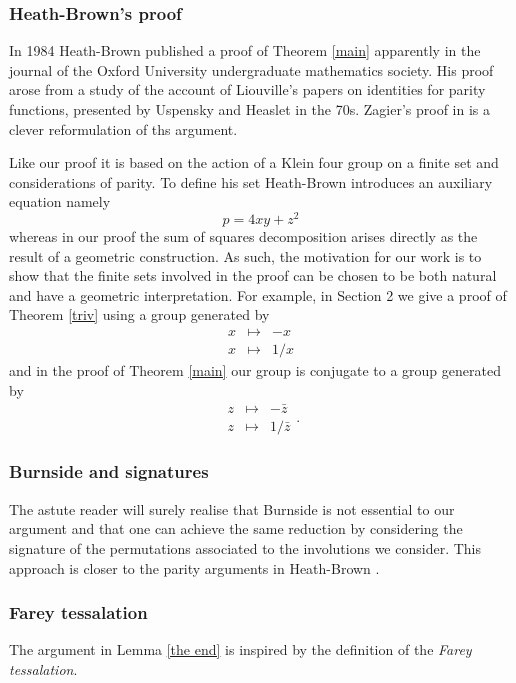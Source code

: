 \subsubsection{Heath-Brown's proof}

In 1984 Heath-Brown published a proof of Theorem \ref{main}
apparently  in the journal of the Oxford University undergraduate mathematics society. 
His proof arose from a study of the account of Liouville’s papers on identities for parity functions, presented  by Uspensky and Heaslet in the 70s. Zagier's proof in \cite{zagier} is a clever reformulation of ths argument.

Like our  proof it is based on the action of a Klein four group 
on a finite set and considerations of parity.
To define his set Heath-Brown introduces an auxiliary equation namely
$$p = 4xy + z^2$$
whereas in our proof the sum of squares decomposition 
arises directly as the  result of a geometric construction.
As such, the motivation for our work is to show that 
the finite sets involved in the proof 
can be chosen to be both natural and have a geometric interpretation.
For example, in Section 2 we give a proof of Theorem \ref{triv}
using a group generated by 
$$ \begin{array}{lll}
x &\mapsto& -x \\
x &\mapsto& 1/x
\end{array}
$$
and in the proof of Theorem \ref{main}
our group is conjugate to a group generated by 
$$ \begin{array}{lll}
z &\mapsto& -\bar{z} \\
z &\mapsto& 1/\bar{z}
\end{array}.
$$



\subsubsection{Burnside and signatures}
 The astute reader will surely realise that Burnside is not essential to our argument
 and that one can achieve the same reduction by considering the signature
 of the permutations associated to the  involutions we consider. 
 This approach is closer to the parity arguments in Heath-Brown \cite{heath}.
 
 \subsubsection{Farey tessalation}
 The argument in Lemma \ref{the end} is inspired by the definition of the 
 \textit{Farey tessalation}.
 
